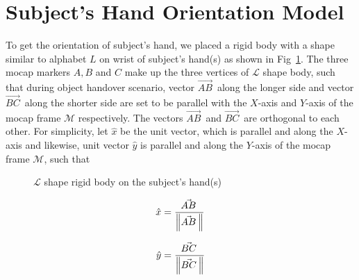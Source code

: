\newpage
\section{Subject's Hand Orientation Model}\label{hand_orientation}
To get the orientation of subject's hand, we placed a rigid body with a shape similar to alphabet $L$ on wrist of subject's hand(s) as shown in Fig~\ref{fig:lshapes}. The three mocap markers $A, B$ and $C$ make up the three vertices of $\mathcal{L}$ shape body, such that during object handover scenario, vector $\vec{AB}^{\,}$ along the longer side and vector $\vec{BC}^{\,}$ along the shorter side are set to be parallel with the $X$-axis and $Y$-axis of the mocap frame $\mathcal{M}$ respectively. The vectors $\vec{AB}^{\,}$ and $\vec{BC}^{\,}$ are orthogonal to each other. For simplicity, let $\hat{x}$ be the unit vector, which is parallel and along the $X$-axis and likewise, unit vector $\hat{y}$ is parallel and along the $Y$-axis of the mocap frame $\mathcal{M}$, such that

\begin{figure}[h]
	\caption{$\mathcal{L}$ shape rigid body on the subject's hand(s)}
	\label{fig:lshapes}
\end{figure}

\begin{equation*}
\hat{x} = \frac{\vec{AB}^{\,}}{\norm{\vec{AB}^{\,}}}
\end{equation*}

\begin{equation*}
\hat{y} = \frac{\vec{BC}^{\,}}{\norm{\vec{BC}^{\,}}}
\end{equation*}

